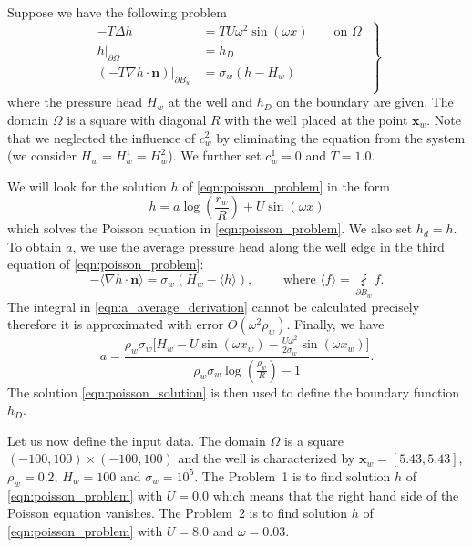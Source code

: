 \documentclass{elsarticle}
\newcommand{\prob}[1]{Problem~{#1}}
\def\vc#1{\mathbf{\boldsymbol{#1}}}     %
\begin{document}
Suppose we have the following problem
\begin{equation} \label{eqn:poisson_problem}
\left.\begin{aligned}
    -T \Delta h &= TU\omega^2\sin(\omega x) \qquad \textrm{on } \Omega \\
    h|_{\partial\Omega} &= h_D\\
    \left(-T\nabla h\cdot\vc{n}\right)|_{\partial B_w} &= \sigma_w\left(h - H_w\right) \\
    \end{aligned}
    \;\right\}
\end{equation}
where the pressure head $H_w$ at the well and $h_D$ on the boundary are given. 
The domain $\Omega$ is a square with diagonal $R$ with the well placed at the point $\vc{x}_w$.
Note that we neglected the influence of $c^2_w$ by eliminating the equation from the system (we consider 
$H_w = H^1_w = H^2_w$). We further set $c^1_w=0$ and $T=1.0$. 

We will look for the solution $h$ of \eqref{eqn:poisson_problem} in the form
\begin{equation} \label{eqn:poisson_solution}
  h=a\log\left(\frac{r_w}{R}\right)+U\sin(\omega x)
\end{equation}
which solves the Poisson equation in \eqref{eqn:poisson_problem}. We also set $h_d=h$.
To obtain $a$, we use the average pressure head along the well edge in the third equation 
of \eqref{eqn:poisson_problem}:
\begin{equation} \label{eqn:a_average_derivation}
     -\langle\nabla h \cdot \vc{n}\rangle = \sigma_w\left(H_w - \langle{h}\rangle \right), 
    \qquad \textrm{ where } \langle{f}\rangle = \fint \limits_{\partial B_w} f.
\end{equation}
The integral in \eqref{eqn:a_average_derivation} cannot be calculated precisely therefore it is approximated with error 
$O(\omega^2 \rho_w)$. Finally, we have
\begin{equation} \label{eqn:a_constant}
    a=\frac{\rho_w \sigma_w \big[H_w - U\sin(\omega x_w) - \frac{U\omega^2}{2\sigma_w}\sin(\omega x_w)\big]}
           {\rho_w \sigma_w \log\left(\frac{\rho_w}{R}\right) - 1}.
\end{equation}
The solution \eqref{eqn:poisson_solution} is then used to define the boundary function $h_D$.

Let us now define the input data. The domain $\Omega$ is a square $(-100,100)\times(-100,100)$ and the well is characterized by 
$\vc{x}_w=[5.43,5.43]$,  $\rho_w=0.2$, $H_w=100$ and $\sigma_w=10^5$. The \prob{1} is to find solution $h$ of
\eqref{eqn:poisson_problem} with $U=0.0$ which means that the right hand side of the Poisson equation vanishes.
The \prob{2} is to find solution $h$ of \eqref{eqn:poisson_problem} with $U=8.0$ and $\omega=0.03$.
\end{document}
